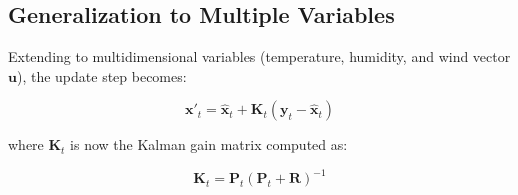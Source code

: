 \documentclass[12pt,a4paper]{article}
\begin{document}
\subsection{Generalization to Multiple Variables}
Extending to multidimensional variables (temperature, humidity, and wind vector $\mathbf{u}$), the update step becomes:

\begin{equation}
\mathbf{x}'_t = \hat{\mathbf{x}}_t + \mathbf{K}_t(\mathbf{y}_t - \hat{\mathbf{x}}_t)
\end{equation}

where $\mathbf{K}_t$ is now the Kalman gain matrix computed as:

\begin{equation}
\mathbf{K}_t = \mathbf{P}_t(\mathbf{P}_t + \mathbf{R})^{-1}
\end{equation}
\end{document}
